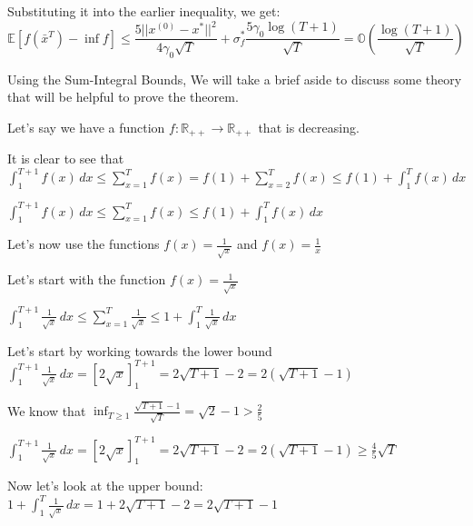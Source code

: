 \noindent Substituting it into the earlier inequality, we get:
\begin{equation}
    \mathbb{E}[f(\bar{x}^T) - \inf f] \leq \frac{5 ||x^{(0)} - x^*||^2}{4 \gamma_0 \sqrt{T}} + \sigma_f^* \frac{5 \gamma_0 \log{(T + 1)}}{\sqrt{T}} = \mathbb{O}(\frac{\log{(T + 1)}}{\sqrt{T}})
\end{equation}


Using the Sum-Integral Bounds, We will take a brief aside to discuss some theory that will be helpful to prove the theorem.  \newline 

Let's say we have a function $f: \mathbb{R}_{++} \rightarrow \mathbb{R}_{++}$ that is decreasing. \newline 

It is clear to see that $\int_{1}^{T + 1} f(x) \,dx \leq \sum_{x=1}^{T} f(x) = f(1) +  \sum_{x=2}^{T} f(x) \leq f(1) + \int_{1}^{T} f(x) \,dx$ \newline 

$\int_{1}^{T + 1} f(x) \,dx \leq \sum_{x=1}^{T} f(x) \leq f(1) + \int_{1}^{T} f(x) \,dx$ \newline 


Let's now use the functions $f(x) = \frac{1}{\sqrt{x}}$ and $f(x) = \frac{1}{x}$

Let's start with the function $f(x) = \frac{1}{\sqrt{x}}$ \newline 

$\int_{1}^{T + 1} \frac{1}{\sqrt{x}} \,dx \leq \sum_{x=1}^{T} \frac{1}{\sqrt{x}} \leq 1 + \int_{1}^{T} \frac{1}{\sqrt{x}} \,dx$ \newline 

Let's start by working towards the lower bound \newline 
$\int_{1}^{T + 1} \frac{1}{\sqrt{x}} \,dx = [2 \sqrt{x}]_1^{T + 1}  = 2 \sqrt{T + 1} - 2 = 2(\sqrt{T + 1} - 1)$ \newline 


We know that $\inf_{T \geq 1} \frac{\sqrt{T + 1} - 1}{\sqrt{T}} = \sqrt{2} - 1 > \frac{2}{5}$ \newline 

$\int_{1}^{T + 1} \frac{1}{\sqrt{x}} \,dx = [2 \sqrt{x}]_1^{T + 1}  = 2 \sqrt{T + 1} - 2 = 2(\sqrt{T + 1} - 1) \geq \frac{4}{5} \sqrt{T}$ \newline 

Now let's look at the upper bound: \newline 
$ 1 + \int_{1}^{T} \frac{1}{\sqrt{x}} \,dx = 1 + 2 \sqrt{T + 1} - 2  = 2 \sqrt{T + 1} - 1 $

